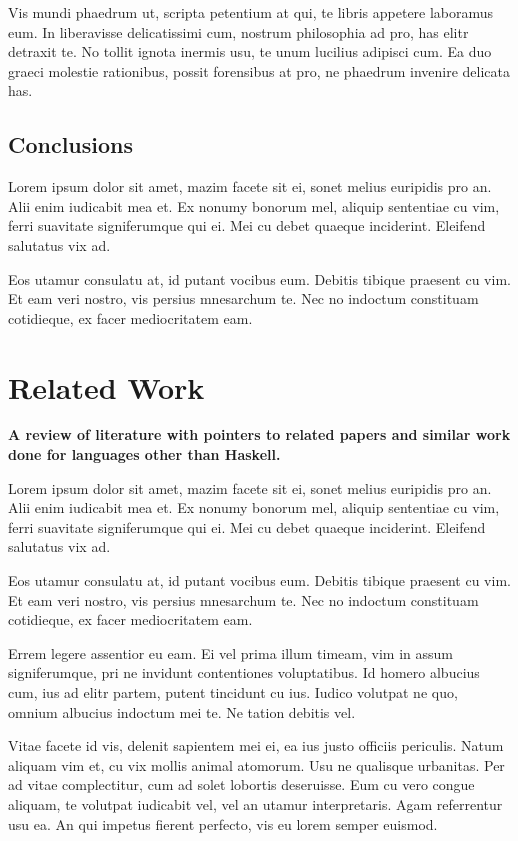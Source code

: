 \documentclass[a4paper,11pt,oneside]{report}
\begin{document}
Vis mundi phaedrum ut, scripta petentium at qui, te libris appetere laboramus
eum. In liberavisse delicatissimi cum, nostrum philosophia ad pro, has elitr
detraxit te. No tollit ignota inermis usu, te unum lucilius adipisci cum. Ea duo
graeci molestie rationibus, possit forensibus at pro, ne phaedrum invenire
delicata has.

\section{Conclusions}

Lorem ipsum dolor sit amet, mazim facete sit ei, sonet melius euripidis pro
an. Alii enim iudicabit mea et. Ex nonumy bonorum mel, aliquip sententiae cu
vim, ferri suavitate signiferumque qui ei. Mei cu debet quaeque
inciderint. Eleifend salutatus vix ad.

Eos utamur consulatu at, id putant vocibus eum. Debitis tibique praesent cu
vim. Et eam veri nostro, vis persius mnesarchum te. Nec no indoctum constituam
cotidieque, ex facer mediocritatem eam.


\chapter{Related Work}

\textbf{A review of literature with pointers to related papers and similar work
  done for languages other than Haskell.}

Lorem ipsum dolor sit amet, mazim facete sit ei, sonet melius euripidis pro
an. Alii enim iudicabit mea et. Ex nonumy bonorum mel, aliquip sententiae cu
vim, ferri suavitate signiferumque qui ei. Mei cu debet quaeque
inciderint. Eleifend salutatus vix ad.

Eos utamur consulatu at, id putant vocibus eum. Debitis tibique praesent cu
vim. Et eam veri nostro, vis persius mnesarchum te. Nec no indoctum constituam
cotidieque, ex facer mediocritatem eam.

Errem legere assentior eu eam. Ei vel prima illum timeam, vim in assum
signiferumque, pri ne invidunt contentiones voluptatibus. Id homero albucius
cum, ius ad elitr partem, putent tincidunt cu ius. Iudico volutpat ne quo,
omnium albucius indoctum mei te. Ne tation debitis vel.

Vitae facete id vis, delenit sapientem mei ei, ea ius justo officiis
periculis. Natum aliquam vim et, cu vix mollis animal atomorum. Usu ne qualisque
urbanitas. Per ad vitae complectitur, cum ad solet lobortis deseruisse. Eum cu
vero congue aliquam, te volutpat iudicabit vel, vel an utamur
interpretaris. Agam referrentur usu ea. An qui impetus fierent perfecto, vis eu
lorem semper euismod.
\end{document}
